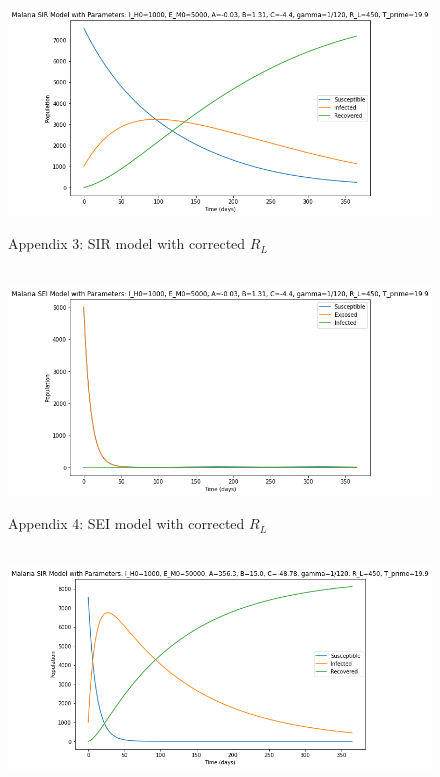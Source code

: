 \documentclass[
	12pt,				%
	oneside,			%
	a4paper,			%
	english,			%
	brazil				%
	]{abntex2}
\begin{document}
\begin{apendicesenv}
\begin{figure}[!ht]
\end{figure} 
\newpage
\begin{figure}[!ht]
	\centering
	\hbox{\hspace{3.5em} \includegraphics[scale=0.55] {THESIS-SIR_RL_adaptado_CORRECAO.png}}
	\caption*{Appendix 3: SIR model with corrected $R_L$}
\end{figure} 
\begin{figure}[!ht]
	\centering
	\hbox{\hspace{3.5em} \includegraphics[scale=0.55] {THESIS-SEI_RL_adaptado_CORRECAO.png}}
	\caption*{Appendix 4: SEI model with corrected $R_L$}
\end{figure}
\newpage
\begin{figure}[!ht]
	\centering
	\hbox{\hspace{2.0em} \includegraphics[scale=0.55] {THESIS-SIR_Aumenta_ABC_CORRECAO.png}}

\end{figure}
\end{apendicesenv}
\end{document}
